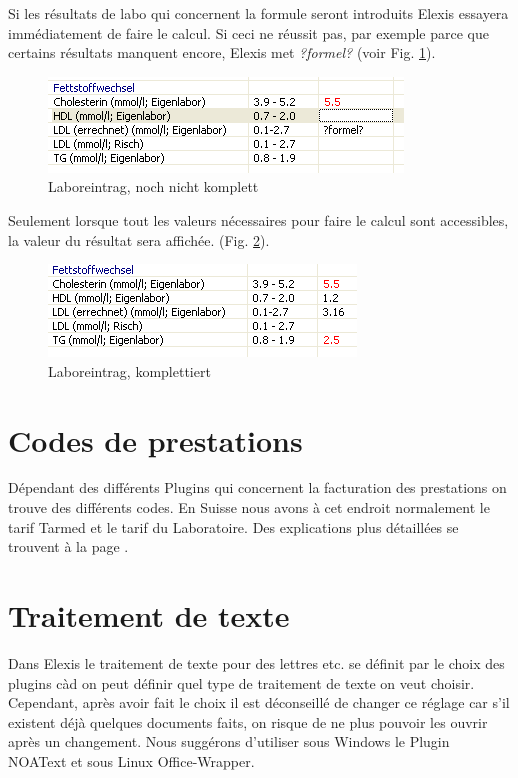  Si les résultats de labo qui concernent la formule seront introduits Elexis essayera immédiatement de faire le calcul. Si ceci ne réussit pas, par exemple parce que certains résultats manquent encore, Elexis met \textit{?formel?} (voir Fig.  \ref{fig:labor4}).
\begin{figure}[htp]
\begin{center}
  \includegraphics{images/labor4}
  \caption{Laboreintrag, noch nicht komplett}
  \label{fig:labor4}
\end{center}
\end{figure}

Seulement lorsque tout les valeurs nécessaires pour faire le calcul sont accessibles, la valeur du résultat sera affichée.  (Fig. \ref{fig:labor5}).
\begin{figure}[htp]
\begin{center}
  \includegraphics{images/labor5}
  \caption{Laboreintrag, komplettiert}
  \label{fig:labor5}
\end{center}
\end{figure}

\section{Codes de prestations}
Dépendant des différents Plugins qui concernent la facturation des prestations on trouve des différents codes. En Suisse nous avons à cet endroit normalement le tarif Tarmed et le tarif du Laboratoire. Des explications plus détaillées se trouvent à la page \pageref{arzttarife}.

\section{Traitement de texte}
Dans Elexis le traitement de texte pour des lettres etc. se définit par le choix des plugins càd on peut définir quel type de traitement de texte on veut choisir. Cependant, après avoir fait le choix il est déconseillé de changer ce réglage car s'il existent déjà quelques documents faits, on risque de ne plus pouvoir les ouvrir après un changement. Nous suggérons d'utiliser sous Windows le Plugin NOAText et sous Linux Office-Wrapper.
